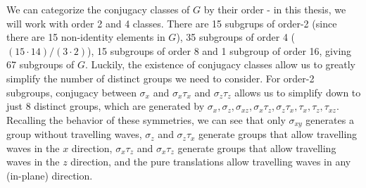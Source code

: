 We can categorize the conjugacy classes of $G$ by their order - in this thesis, we will work with order 2 and 4 classes. There are 15 subgrups of order-2 (since there are 15 non-identity elements in $G$), 35 subgroups of order 4 ($(15\cdot14) /(3\cdot2)$), 15 subgroups of order 8 and 1 subgroup of order 16, giving 67 subgroups of $G$. Luckily, the existence of conjugacy classes allow us to greatly simplify the number of distinct groups we need to consider. For order-2 subgroups, conjugacy between $\sigma_x$ and $\sigma_x\tau_x$ and $\sigma_z\tau_z$ allows us to simplify down to just 8 distinct groups, which are generated by $\sigma_x,\sigma_z,\sigma_{xz},\sigma_x\tau_z,\sigma_z\tau_x,\tau_x,\tau_z,\tau_{xz}$. Recalling the behavior of these symmetries, we can see that only $\sigma_{xy}$ generates a group without travelling waves, $\sigma_z$ and $\sigma_z\tau_x$ generate groups that allow travelling waves in the $x$ direction, $\sigma_x\tau_z$ and $\sigma_x\tau_z$ generate groups that allow travelling waves in the $z$ direction, and the pure translations allow travelling waves in any (in-plane) direction. \\

  
